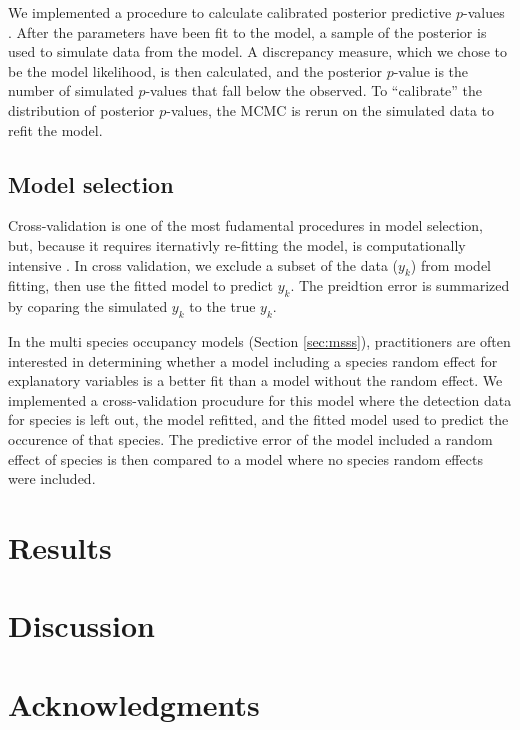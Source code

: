 \documentclass[12pt]{article}
\begin{document}
We implemented a procedure to calculate calibrated posterior
predictive $p$-values \citep{hjort-etal-06}. After the parameters have
been fit to the model, a sample of the posterior is used to simulate
data from the model. A discrepancy measure, which we chose to be the
model likelihood, is then calculated, and the posterior $p$-value is
the number of simulated $p$-values that fall below the observed. To
``calibrate'' the distribution of posterior $p$-values, the MCMC is
rerun on the simulated data to refit the model. 

\subsection*{Model selection}
\label{sec:select}

Cross-validation is one of the most fudamental procedures in model
selection, but, because it requires iternativly re-fitting the model,
is computationally intensive \citep{hooten2014guide}. In cross
validation, we exclude a subset of the data ($y_k$) from model
fitting, then use the fitted model to predict $y_k$. The preidtion
error is summarized by coparing the simulated $y_k$ to the true $y_k$.

In the multi species occupancy models (Section \ref{sec:msss}),
practitioners are often interested in determining whether a model
including a species random effect for explanatory variables is a
better fit than a model without the random effect. We implemented a
cross-validation procudure for this model where the detection data for
species is left out, the model refitted, and the fitted model used to
predict the occurence of that species. The predictive error of the
model included a random effect of species is then compared to a model
where no species random effects were included.


\section*{Results}
\label{sec:results}

\section*{Discussion}
\label{sec:discussion}

\section*{Acknowledgments}
\label{sec:acknowledge}
\end{document}
